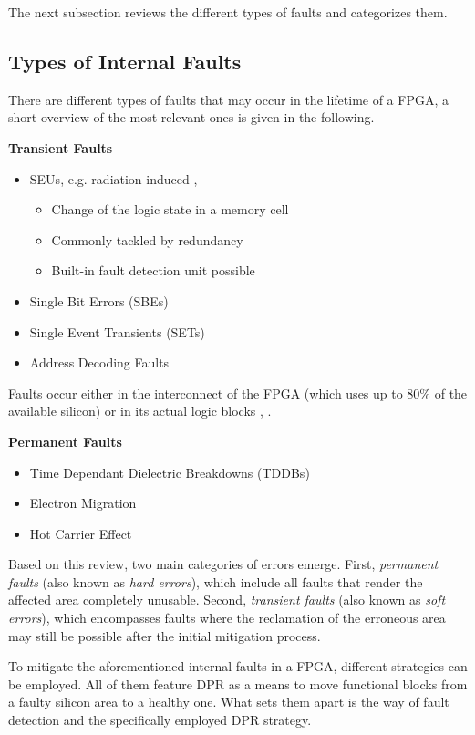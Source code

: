 The next subsection reviews the different types of faults and categorizes them. 

\subsection{Types of Internal Faults}
There are different types of faults that may occur in the lifetime of a \gls{FPGA}, a short overview of the most relevant ones is given in the following.
\par
\textbf{Transient Faults}
\begin{itemize}
    \item \glspl{SEU}, e.g. radiation-induced \cite{alkady_fault-tolerant_2014}, \cite{lee_fault-tolerant_2017}
    \begin{itemize}
    \item Change of the logic state in a memory cell
    \item Commonly tackled by redundancy
    \item Built-in fault detection unit possible
    \end{itemize}
    \item Single Bit Errors (SBEs)
    \item Single Event Transients (SETs)
    \item Address Decoding Faults
\end{itemize}

Faults occur either in the interconnect of the \gls{FPGA} (which uses up to 80\% of the available silicon) or in its actual logic blocks \cite{alkady_fault-tolerant_2014}, \cite{jing_huang_routability_2004}.
\par
\textbf{Permanent Faults}
\begin{itemize}
    \item Time Dependant Dielectric Breakdowns (TDDBs)
    \item Electron Migration
    \item Hot Carrier Effect
\end{itemize}

Based on this review, two main categories of errors emerge.
First, \textit{permanent faults} (also known as \textit{hard errors}), which include all faults that render the affected area completely unusable. 
Second, \textit{transient faults} (also known as \textit{soft errors}), which encompasses faults where the reclamation of the erroneous area may still be possible after the initial mitigation process.

To mitigate the aforementioned internal faults in a \gls{FPGA}, different strategies can be employed.
All of them feature \gls{DPR} as a means to move functional blocks from a faulty silicon area to a healthy one.
What sets them apart is the way of fault detection and the specifically employed \gls{DPR} strategy.


